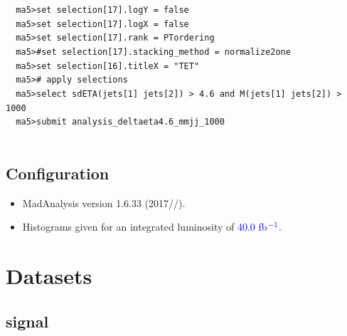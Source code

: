 \documentclass[a4paper, 10pt]{article}
\begin{document}
\texttt{ }\texttt{ }\texttt{ma5>set selection[17].logY = false\\
}
\texttt{ }\texttt{ }\texttt{ma5>set selection[17].logX = false\\
}
\texttt{ }\texttt{ }\texttt{ma5>set selection[17].rank = PTordering\\
}
\texttt{ }\texttt{ }\texttt{ma5>\#set selection[17].stacking\_method = normalize2one\\
}
\texttt{ }\texttt{ }\texttt{ma5>set selection[16].titleX = "TET"\\
}
\texttt{ }\texttt{ }\texttt{ma5>\# apply selections\\
}
\texttt{ }\texttt{ }\texttt{ma5>select sdETA(jets[1] jets[2]) > 4.6 and M(jets[1] jets[2]) > 1000\\
}
\texttt{ }\texttt{ }\texttt{ma5>submit analysis\_deltaeta4.6\_mmjj\_1000\\
}
\texttt{ }\texttt{ }\subsection{ Configuration}

\begin{itemize}
  \item MadAnalysis version 1.6.33 (2017//).
   \item Histograms given for an integrated luminosity of \textcolor{blue}{40.0}\textcolor{blue}{ fb}$^{\textcolor{blue}{-1}}$\textcolor{blue}{.}
\textcolor{blue}{}
\end{itemize}
\newpage
\section{ Datasets}

\subsection{ signal}
\end{document}
